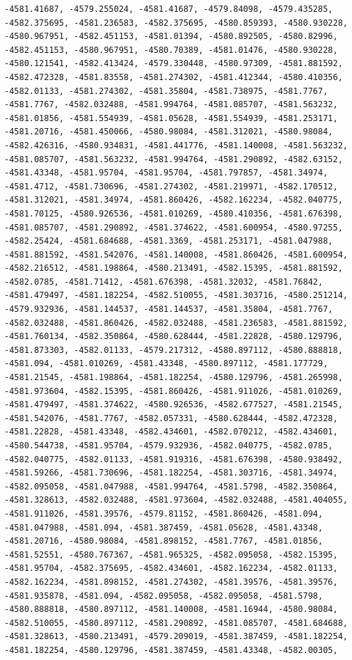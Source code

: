 \documentclass[
]{article}
\begin{document}
\begin{verbatim}
-4581.41687, -4579.255024, -4581.41687, -4579.84098, -4579.435285,  -4582.375695, -4581.236583, -4582.375695, -4580.859393, -4580.930228,  -4580.967951, -4582.451153, -4581.01394, -4580.892505, -4580.82996,  -4582.451153, -4580.967951, -4580.70389, -4581.01476, -4580.930228,  -4580.121541, -4582.413424, -4579.330448, -4580.97309, -4581.881592,  -4582.472328, -4581.83558, -4581.274302, -4581.412344, -4580.410356,  -4582.01133, -4581.274302, -4581.35804, -4581.738975, -4581.7767,  -4581.7767, -4582.032488, -4581.994764, -4581.085707, -4581.563232,  -4581.01856, -4581.554939, -4581.05628, -4581.554939, -4581.253171,  -4581.20716, -4581.450066, -4580.98084, -4581.312021, -4580.98084,  -4582.426316, -4580.934831, -4581.441776, -4581.140008, -4581.563232,  -4581.085707, -4581.563232, -4581.994764, -4581.290892, -4582.63152,  -4581.43348, -4581.95704, -4581.95704, -4581.797857, -4581.34974,  -4581.4712, -4581.730696, -4581.274302, -4581.219971, -4582.170512,  -4581.312021, -4581.34974, -4581.860426, -4582.162234, -4582.040775,  -4581.70125, -4580.926536, -4581.010269, -4580.410356, -4581.676398,  -4581.085707, -4581.290892, -4581.374622, -4581.600954, -4580.97255,  -4582.25424, -4581.684688, -4581.3369, -4581.253171, -4581.047988,  -4581.881592, -4581.542076, -4581.140008, -4581.860426, -4581.600954,  -4582.216512, -4581.198864, -4580.213491, -4582.15395, -4581.881592,  -4582.0785, -4581.71412, -4581.676398, -4581.32032, -4581.76842,  -4581.479497, -4581.182254, -4582.510055, -4581.303716, -4580.251214,  -4579.932936, -4581.144537, -4581.144537, -4581.35804, -4581.7767,  -4582.032488, -4581.860426, -4582.032488, -4581.236583, -4581.881592,  -4581.760134, -4582.350864, -4580.628444, -4581.22828, -4580.129796,  -4581.873303, -4582.01133, -4579.217312, -4580.897112, -4580.888818,  -4581.094, -4581.010269, -4581.43348, -4580.897112, -4581.177729,  -4581.21545, -4581.198864, -4581.182254, -4580.129796, -4581.265998,  -4581.973604, -4582.15395, -4581.860426, -4581.911026, -4581.010269,  -4581.479497, -4581.374622, -4580.926536, -4582.677527, -4581.21545,  -4581.542076, -4581.7767, -4582.057331, -4580.628444, -4582.472328,  -4581.22828, -4581.43348, -4582.434601, -4582.070212, -4582.434601,  -4580.544738, -4581.95704, -4579.932936, -4582.040775, -4582.0785,  -4582.040775, -4582.01133, -4581.919316, -4581.676398, -4580.938492,  -4581.59266, -4581.730696, -4581.182254, -4581.303716, -4581.34974,  -4582.095058, -4581.047988, -4581.994764, -4581.5798, -4582.350864,  -4581.328613, -4582.032488, -4581.973604, -4582.032488, -4581.404055,  -4581.911026, -4581.39576, -4579.81152, -4581.860426, -4581.094,  -4581.047988, -4581.094, -4581.387459, -4581.05628, -4581.43348,  -4581.20716, -4580.98084, -4581.898152, -4581.7767, -4581.01856,  -4581.52551, -4580.767367, -4581.965325, -4582.095058, -4582.15395,  -4581.95704, -4582.375695, -4582.434601, -4582.162234, -4582.01133,  -4582.162234, -4581.898152, -4581.274302, -4581.39576, -4581.39576,  -4581.935878, -4581.094, -4582.095058, -4582.095058, -4581.5798,  -4580.888818, -4580.897112, -4581.140008, -4581.16944, -4580.98084,  -4582.510055, -4580.897112, -4581.290892, -4581.085707, -4581.684688,  -4581.328613, -4580.213491, -4579.209019, -4581.387459, -4581.182254,  -4581.182254, -4580.129796, -4581.387459, -4581.43348, -4582.00305,  
\end{verbatim}
\end{document}

